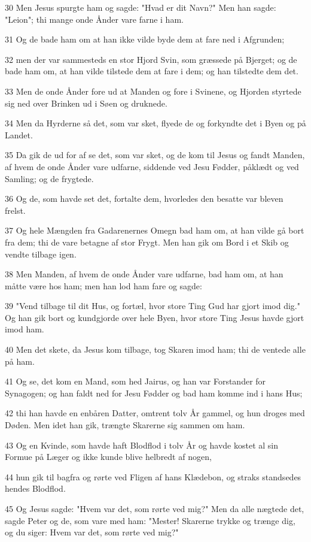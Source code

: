 \par 30 Men Jesus spurgte ham og sagde: "Hvad er dit Navn?" Men han sagde: "Leion"; thi mange onde Ånder vare farne i ham.
\par 31 Og de bade ham om at han ikke vilde byde dem at fare ned i Afgrunden;
\par 32 men der var sammesteds en stor Hjord Svin, som græssede på Bjerget; og de bade ham om, at han vilde tilstede dem at fare i dem; og han tilstedte dem det.
\par 33 Men de onde Ånder fore ud at Manden og fore i Svinene, og Hjorden styrtede sig ned over Brinken ud i Søen og druknede.
\par 34 Men da Hyrderne så det, som var sket, flyede de og forkyndte det i Byen og på Landet.
\par 35 Da gik de ud for af se det, som var sket, og de kom til Jesus og fandt Manden, af hvem de onde Ånder vare udfarne, siddende ved Jesu Fødder, påklædt og ved Samling; og de frygtede.
\par 36 Og de, som havde set det, fortalte dem, hvorledes den besatte var bleven frelst.
\par 37 Og hele Mængden fra Gadarenernes Omegn bad ham om, at han vilde gå bort fra dem; thi de vare betagne af stor Frygt. Men han gik om Bord i et Skib og vendte tilbage igen.
\par 38 Men Manden, af hvem de onde Ånder vare udfarne, bad ham om, at han måtte være hos ham; men han lod ham fare og sagde:
\par 39 "Vend tilbage til dit Hus, og fortæl, hvor store Ting Gud har gjort imod dig." Og han gik bort og kundgjorde over hele Byen, hvor store Ting Jesus havde gjort imod ham.
\par 40 Men det skete, da Jesus kom tilbage, tog Skaren imod ham; thi de ventede alle på ham.
\par 41 Og se, det kom en Mand, som hed Jairus, og han var Forstander for Synagogen; og han faldt ned for Jesu Fødder og bad ham komme ind i hans Hus;
\par 42 thi han havde en enbåren Datter, omtrent tolv År gammel, og hun droges med Døden. Men idet han gik, trængte Skarerne sig sammen om ham.
\par 43 Og en Kvinde, som havde haft Blodflod i tolv År og havde kostet al sin Formue på Læger og ikke kunde blive helbredt af nogen,
\par 44 hun gik til bagfra og rørte ved Fligen af hans Klædebon, og straks standsedes hendes Blodflod.
\par 45 Og Jesus sagde: "Hvem var det, som rørte ved mig?" Men da alle nægtede det, sagde Peter og de, som vare med ham: "Mester! Skarerne trykke og trænge dig, og du siger: Hvem var det, som rørte ved mig?"
